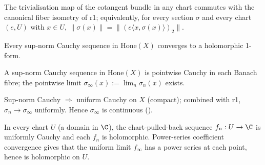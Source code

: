 \begin{lemma}
\label{lem:r8subB-A-r2}
The trivialisation map of the cotangent bundle in any chart commutes
with the canonical fiber isometry of r1; equivalently, for every
section \(\sigma\) and every chart \((e,U)\) with \(x\in U\),
\(\|\sigma(x)\| = \|(e\langle x,\sigma(x)\rangle)_{2}\|\).
\leanok
\end{lemma}

\begin{lemma}
\label{lem:r8subB-supnorm-cauchy}
Every sup-norm Cauchy sequence in \(\mathrm{Hone}(X)\) converges
to a holomorphic 1-form.
\leanok
\end{lemma}

\begin{lemma}
\label{lem:r8subB-B-r1}
A sup-norm Cauchy sequence in \(\mathrm{Hone}(X)\) is pointwise
Cauchy in each Banach fibre; the pointwise limit
\(\sigma_{\infty}(x):=\lim_{n}\sigma_{n}(x)\) exists.
\leanok
\end{lemma}

\begin{lemma}
\label{lem:r8subB-B-r2}
Sup-norm Cauchy \(\Rightarrow\) uniform Cauchy on \(X\) (compact); combined
with r1, \(\sigma_{n}\to\sigma_{\infty}\) uniformly.  Hence
\(\sigma_{\infty}\) is continuous ().
\leanok
\end{lemma}

\begin{lemma}
\label{lem:r8subB-B-r3}
In every chart \(U\) (a domain in \(\C\)), the chart-pulled-back
sequence \(f_{n}:U\to\C\) is uniformly Cauchy and each \(f_{n}\) is
holomorphic.  Power-series coefficient convergence gives that the
uniform limit \(f_{\infty}\) has a power series at each point, hence
is holomorphic on \(U\).
\leanok
\end{lemma}

